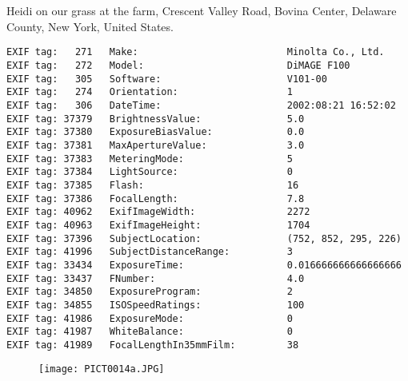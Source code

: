 \section{\protect{}}
\noindent Heidi on our grass at the farm, Crescent Valley Road, Bovina Center, Delaware County, New York, United States.
\noindent
\begin{lstlisting}
EXIF tag:   271   Make:                          Minolta Co., Ltd.
EXIF tag:   272   Model:                         DiMAGE F100
EXIF tag:   305   Software:                      V101-00
EXIF tag:   274   Orientation:                   1
EXIF tag:   306   DateTime:                      2002:08:21 16:52:02
EXIF tag: 37379   BrightnessValue:               5.0
EXIF tag: 37380   ExposureBiasValue:             0.0
EXIF tag: 37381   MaxApertureValue:              3.0
EXIF tag: 37383   MeteringMode:                  5
EXIF tag: 37384   LightSource:                   0
EXIF tag: 37385   Flash:                         16
EXIF tag: 37386   FocalLength:                   7.8
EXIF tag: 40962   ExifImageWidth:                2272
EXIF tag: 40963   ExifImageHeight:               1704
EXIF tag: 37396   SubjectLocation:               (752, 852, 295, 226)
EXIF tag: 41996   SubjectDistanceRange:          3
EXIF tag: 33434   ExposureTime:                  0.016666666666666666
EXIF tag: 33437   FNumber:                       4.0
EXIF tag: 34850   ExposureProgram:               2
EXIF tag: 34855   ISOSpeedRatings:               100
EXIF tag: 41986   ExposureMode:                  0
EXIF tag: 41987   WhiteBalance:                  0
EXIF tag: 41989   FocalLengthIn35mmFilm:         38

\end{lstlisting}
\clearpage
\begin{figure}
\raggedleft
\texttt{[image: PICT0014a.JPG]}
\end{figure}


\clearpage
